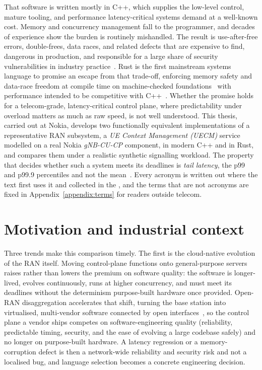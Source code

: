 \documentclass[english,oneside,a4paper,censored,csm,software-track-2020]{HYthesisML}
\begin{document}
That software is written mostly in C++, which supplies the low-level control, mature tooling, and
performance latency-critical systems demand at a well-known cost. Memory and concurrency
management fall to the programmer, and decades of experience show the burden is routinely
mishandled. The result is use-after-free errors, double-frees, data races, and related defects
that are expensive to find, dangerous in production, and responsible for a large share of security
vulnerabilities in industry practice~\cite{msrc2019memory,google2022android}. Rust is the first
mainstream systems language to promise an escape from that trade-off, enforcing memory safety and
data-race freedom at compile time on machine-checked
foundations~\cite{klabnik2023rust,jung2018rustbelt} with performance intended to be competitive
with C++~\cite{balasubramanian2017rust}. Whether the promise holds for a telecom-grade,
latency-critical control plane, where predictability under overload matters as much as raw speed,
is not well understood. This thesis, carried out at Nokia, develops two functionally equivalent
implementations of a representative RAN subsystem, a \emph{UE Context Management (UECM)} service
modelled on a real Nokia \emph{gNB-CU-CP} component, in modern C++ and in Rust, and compares them
under a realistic synthetic signalling workload. The property that decides whether such a system
meets its deadlines is \emph{tail latency}, the p99 and p99.9 percentiles and not the
mean~\cite{dean2013tail,barroso2017microseconds}. Every acronym is written out where the
text first uses it and collected in the \nomname{}, and the terms that are not acronyms are fixed
in Appendix~\ref{appendix:terms} for readers outside telecom.

\section{Motivation and industrial context}\label{sec:motivation}
Three trends make this comparison timely. The first is the cloud-native evolution of the RAN
itself. Moving control-plane functions onto general-purpose servers raises rather than lowers the
premium on software quality: the software is longer-lived, evolves continuously, runs at higher
concurrency, and must meet its deadlines without the determinism purpose-built hardware once
provided. Open-RAN disaggregation accelerates that shift, turning the base station into
virtualised, multi-vendor software connected by open interfaces~\cite{polese2023oran}, so the
control plane a vendor ships competes on software-engineering quality (reliability, predictable
timing, security, and the ease of evolving a large codebase safely) and no longer on
purpose-built hardware. A latency regression or a memory-corruption defect is then a
network-wide reliability and security risk and not a localised bug, and language selection
becomes a concrete engineering decision.
\end{document}
